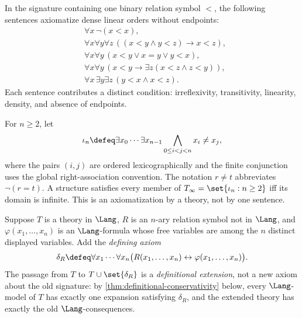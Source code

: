 \begin{example}
In the signature containing one binary relation symbol \(<\), the following
sentences axiomatize dense linear orders without endpoints:
\[
\begin{aligned}
&\forall x\,\neg(x<x),\\
&\forall x\forall y\forall z\,
  ((x<y\land y<z)\to x<z),\\
&\forall x\forall y\,(x<y\lor x=y\lor y<x),\\
&\forall x\forall y\,(x<y\to\exists z(x<z\land z<y)),\\
&\forall x\,\exists y\exists z\,(y<x\land x<z).
\end{aligned}
\]
Each sentence contributes a distinct condition: irreflexivity, transitivity,
linearity, density, and absence of endpoints.
\end{example}

\begin{example}
For \(n\geq2\), let
\[
 \iota_n\defeq
 \exists x_0\cdots\exists x_{n-1}
 \bigwedge_{0\leq i<j<n}x_i\ne x_j,
\]
where the pairs \((i,j)\) are ordered lexicographically and the finite
conjunction uses the global right-association convention.  The notation
\(r\ne t\) abbreviates \(\neg(r=t)\).  A structure satisfies every
member of \(T_\infty=\set{\iota_n:n\geq2}\) iff its domain is
infinite.  This is an axiomatization by a theory, not by one sentence.
\end{example}

\begin{example}
Suppose \(T\) is a theory in \(\Lang\), \(R\) is an \(n\)-ary relation
symbol not in \(\Lang\), and \(\varphi(x_1,\ldots,x_n)\) is an
\(\Lang\)-formula whose free variables are among the \(n\) distinct
displayed variables.  Add the \emph{defining axiom}
\[
 \delta_R\defeq
 \forall x_1\cdots\forall x_n
 \bigl(R(x_1,\ldots,x_n)\leftrightarrow
       \varphi(x_1,\ldots,x_n)\bigr).
\]
The passage from \(T\) to \(T\cup\set{\delta_R}\) is a
\emph{definitional extension}, not a new axiom about the old signature:
by \cref{thm:definitional-conservativity} below, every \(\Lang\)-model of
\(T\) has exactly one expansion satisfying \(\delta_R\), and the extended
theory has exactly the old \(\Lang\)-consequences.
\end{example}

